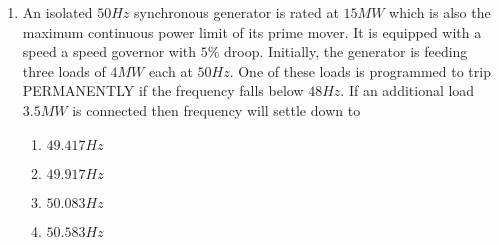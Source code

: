 \documentclass[journal]{IEEEtran}
\numberwithin{equation}{enumi}
\numberwithin{figure}{enumi}
\begin{document}
\begin{enumerate}
    \item 
    An isolated $50Hz$ synchronous generator is rated at $15MW$ which is also the maximum continuous power limit of its prime mover. It is equipped with a speed a speed governor with $5\%$ droop. Initially, the generator is feeding three loads of $4MW$ each at $50Hz$. One of these loads is programmed to trip PERMANENTLY if the frequency falls below $48Hz$. If an additional load $3.5MW$ is connected then frequency will settle down to
    \hfill{}
    \begin{multicols}{4}
        \begin{enumerate}
            \item $49.417Hz$
            \item $49.917Hz$
            \item $50.083Hz$
            \item $50.583Hz$
        \end{enumerate}
    \end{multicols}
    
\end{enumerate}
\end{document}
